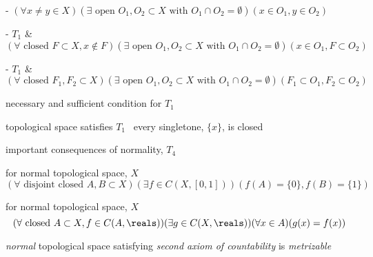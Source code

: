 \documentclass[17pt,landscape]{foils}
\begin{document}
{{		\vitem {}
		\bit
			\item [-] $(\forall x \neq y \in X)(\exists \mbox{ open }O_1, O_2\subset X \mbox{ with } O_1\cap O_2=\emptyset)(x \in O_1, y \in O_2) $
		\eit

		\vitem {}
		\bit
			\item [-] $T_1$ \&\
			$ (\forall \mbox{ closed } F \subset X, x \not\in F)
			(\exists \mbox{ open }O_1, O_2\subset X \mbox{ with } O_1\cap O_2=\emptyset)
			(x \in O_1, F \subset O_2)$
		\eit

		\vitem {}
		\bit
			\item [-] $T_1$ \&\
			$ (\forall \mbox{ closed } F_1, F_2 \subset X)
			(\exists \mbox{ open }O_1, O_2\subset X \mbox{ with } O_1\cap O_2=\emptyset)
			(F_1 \subset O_1, F_2 \subset O_2)$
		\eit
	\eit
\eit



\bit
	\item necessary and sufficient condition for $T_1$

	\bit
		\vitem topological space satisfies $T_1$ \iaoi\ every singletone, $\{x\}$, is closed
	\eit

	\vvitem important consequences of normality, $T_4$

	\bit
		\vitem {} for normal topological space, $X$\
%
		$$
			(\forall \mbox{ disjoint closed } A, B \subset X) (\exists f\in C(X,[0,1])) (f(A) = \{0\}, f(B) = \{1\})
		$$

		\vitem {} for normal topological space, $X$\
%
		$$
			(\forall \mbox{ closed } A \subset X, f\in C(A,\reals))
			(\exists g \in C(X,\reals))
			(\forall x \in A)
			(g(x) = f(x))
		$$

		\vitem {}
			\emph{normal} topological space satisfying \emph{second axiom of countability}
			is \emph{metrizable}
	\eit
\eit



}}
\end{document}
